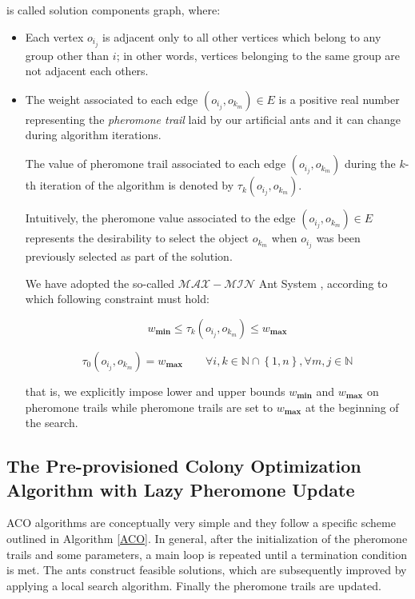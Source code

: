 \documentclass[12pt,a4paper]{report}
\newcommand{\N}{\mathbb{N}}
\begin{document}
is called solution components graph, where:
 
\begin{itemize}
	
	\item Each vertex $o_{i_j}$ is adjacent only to all other vertices which belong to any group other than $i$; in other words, vertices belonging to the same group are not adjacent each others.
	
	\item The weight associated to each edge $(o_{i_j}, o_{k_m}) \in E$ is a positive real number representing the \textit{pheromone trail} laid by our artificial ants and it can change during algorithm iterations. 
	
	The value of pheromone trail associated to each edge $(o_{i_j}, o_{k_m})$ during the $k$-th iteration of the algorithm is denoted by $\tau_k(o_{i_j}, o_{k_m})$.
	
	Intuitively, the pheromone value associated to the edge $(o_{i_j}, o_{k_m}) \in E$ represents the desirability to select the object $o_{k_m}$ when $o_{i_j}$ was been previously selected as part of the solution. 
	
	We have adopted the so-called $\mathcal{MAX} - \mathcal{MIN}$ Ant System \cite{MAXMIN}, according to which following constraint must hold:
	
	\begin{equation}
		w_{\textbf{min}} \leq \tau_k(o_{i_j}, o_{k_m}) \leq w_{\textbf{max}} 
	\end{equation}

	\begin{equation}
		\tau_0(o_{i_j}, o_{k_m}) = w_{\textbf{max}} \qquad \forall i,k \in \N \cap \left\{1,n\right\}, \forall m,j \in \N 
	\end{equation}
	
	that is, we explicitly impose lower and upper bounds $w_{\textbf{min}}$ and $w_{\textbf{max}}$ on pheromone
	trails while pheromone trails are set to $w_{\textbf{max}}$ at the beginning of the search.
\end{itemize}

\subsection{The Pre-provisioned Colony Optimization Algorithm with Lazy Pheromone Update}

ACO algorithms are conceptually very simple and they follow a specific scheme outlined in Algorithm \ref{ACO}. In general, after the initialization of the pheromone trails and some parameters, a main loop is repeated until a termination condition is met. The ants construct feasible solutions, which are subsequently improved by applying a local search algorithm. Finally the pheromone trails are updated.
\end{document}
